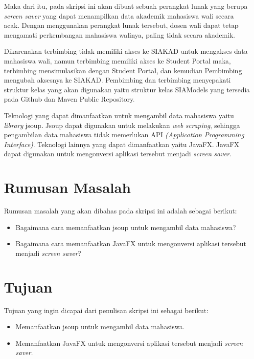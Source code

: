 \documentclass[a4paper,twoside]{article}
\begin{document}
Maka dari itu, pada skripsi ini akan dibuat sebuah perangkat lunak yang berupa \textit{screen saver} yang dapat menampilkan data akademik mahasiswa wali secara acak. Dengan menggunakan perangkat lunak tersebut, dosen wali dapat tetap mengamati perkembangan mahasiswa walinya, paling tidak secara akademik.

Dikarenakan terbimbing tidak memiliki akses ke SIAKAD untuk mengakses data mahasiswa wali, namun terbimbing memiliki akses ke Student Portal maka, terbimbing mensimulasikan dengan Student Portal, dan kemudian Pembimbing mengubah aksesnya ke SIAKAD. Pembimbing dan terbimbing menyepakati struktur kelas yang akan digunakan yaitu struktur kelas SIAModels yang tersedia pada Github dan Maven Public Repository.

Teknologi yang dapat dimanfaatkan untuk mengambil data mahasiswa yaitu \textit{library} jsoup. Jsoup dapat digunakan untuk melakukan \textit{web scraping}, sehingga pengambilan data mahasiswa tidak memerlukan API \textit{(Application Programming Interface)}. Teknologi lainnya yang dapat dimanfaatkan yaitu JavaFX. JavaFX dapat digunakan untuk mengonversi aplikasi tersebut menjadi \textit{screen saver}.

\section{Rumusan Masalah}
Rumusan masalah yang akan dibahas pada skripsi ini adalah sebagai berikut:
\begin{itemize}
	\item Bagaimana cara memanfaatkan jsoup untuk mengambil data mahasiswa?
	\item Bagaimana cara memanfaatkan JavaFX untuk mengonversi aplikasi tersebut menjadi \textit{screen saver}?
\end{itemize}   

\section{Tujuan}
Tujuan yang ingin dicapai dari penulisan skripsi ini sebagai berikut:
\begin{itemize}
    \item Memanfaatkan jsoup untuk mengambil data mahasiswa.
    \item Memanfaatkan JavaFX untuk mengonversi aplikasi tersebut menjadi \textit{screen saver}.
\end{itemize}
\end{document}
